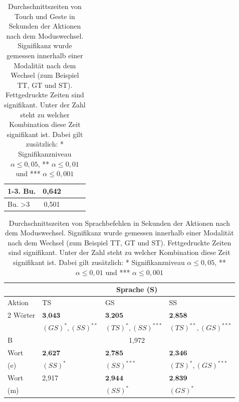 \begin{table}[ht]
\begin{tabular}{|l|l|l|l|l|l|l|}
		1-3. Bu.		& \multicolumn{3}{|c|}{0,642} &				& 			&  	 \\
		\hline
		Bu. >3 					& \multicolumn{3}{|c|}{0,501} &				& 		&  		\\
		\hline
  \end{tabular}
	\caption[Zweite Vereinfachung der Durchschnittszeiten von Touch und Geste nach dem Moduswechsel]{Durchschnittszeiten von Touch und Geste in Sekunden der Aktionen nach dem Moduswechsel. Signifikanz wurde gemessen innerhalb einer Modalität nach dem Wechsel (zum Beispiel TT, GT und ST). Fettgedruckte Zeiten sind signifikant. Unter der Zahl steht zu welcher Kombination diese Zeit signifikant ist. Dabei gilt zusätzlich: * Signifikanzniveau $\alpha \leq 0,05$, ** $\alpha \leq 0,01$ und *** $\alpha \leq 0,001$}
	\label{tab:OperatorzeitenNachWechsel3_TouchGeste}
\end{table}
\begin{table}[ht]
  \centering
	\begin{tabular}{|l|l|l|l|}
		\hline
		& \multicolumn{3}{|c|}{Sprache (S)}\\
		\hline
		Aktion 					&TS 	& GS 	& SS\\
		\hline
		2 Wörter		&	$\textbf{3,043}$						& $\textbf{3,205}$							& $\textbf{2,858}$\\
								&	\small{$(GS)^{*},(SS)^{**}$}	& \small{$(TS)^{*},(SS)^{***}$}	& \small{$(TS)^{**},(GS)^{***}$}\\
		\hline
		B						&\multicolumn{3}{|c|}{1,972}\\
		\hline
		Wort   		& $\textbf{2,627}$	& $\textbf{2,785}$		& $\textbf{2,346}$ \\
		(e)						& \small{$(SS)^{*}$}& \small{$(SS)^{***}$}	& \small{$(TS)^{*},(GS)^{***}$} \\
		\hline
		Wort  			& 2,917 & $\textbf{2,944}$ 	& $\textbf{2,839}$ \\
		(m)						& 			& \small{$(SS)^{*}$} & \small{$(GS)^{*}$} \\
		\hline
  \end{tabular}
	\caption[Zweite Vereinfachung der Durchschnittszeiten von Sprache nach dem Moduswechsel]{Durchschnittszeiten von Sprachbefehlen in Sekunden der Aktionen nach dem Moduswechsel. Signifikanz wurde gemessen innerhalb einer Modalität nach dem Wechsel (zum Beispiel TT, GT und ST). Fettgedruckte Zeiten sind signifikant. Unter der Zahl steht zu welcher Kombination diese Zeit signifikant ist. Dabei gilt zusätzlich: * Signifikanzniveau $\alpha \leq 0,05$, ** $\alpha \leq 0,01$ und *** $\alpha \leq 0,001$}
	\label{tab:OperatorzeitenNachWechsel3_Sprache}
\end{table}

